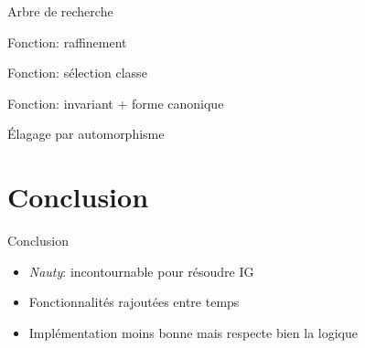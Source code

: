 \documentclass[11pt]{beamer}
\begin{document}
\begin{frame}{Arbre de recherche}

    \begin{figure}[h!]
        \centering
        \resizebox{0.9\textwidth}{!}{%
        }
        \end{figure}
    \end{frame}
            

\begin{frame}{Fonction: raffinement}

\begin{figure}[h!]
    \centering
    \resizebox{\textwidth}{!}{%
    }
    \end{figure}
\end{frame}


\begin{frame}{Fonction: sélection classe}

\begin{figure}[h!]
    \centering
    \resizebox{0.5\textwidth}{!}{%
    }
    \end{figure}
\end{frame}


\begin{frame}{Fonction: invariant + forme canonique}

    \begin{figure}[h!]
        \centering
        \resizebox{0.9\textwidth}{!}{%
        }
        \end{figure}
\end{frame}
            

\begin{frame}{Élagage par automorphisme}
    \begin{figure}[h!]
        \makebox[\textwidth][l]{%
            \hspace*{-0.8cm}%
            \resizebox{\textwidth}{!}{%
            }%
        }
    \end{figure}
\end{frame}


\section{Conclusion}

\begin{frame}{Conclusion}
\begin{itemize}
    \item \textit{Nauty}: incontournable pour résoudre $\mathrm{IG}$
    \item Fonctionnalités rajoutées entre temps
    \item Implémentation moins bonne  mais respecte bien la logique
\end{itemize}
\end{frame}
\end{document}
